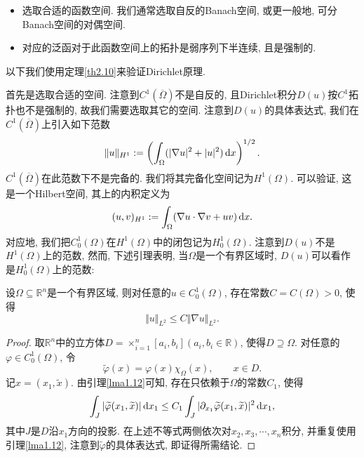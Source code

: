 \begin{itemize}
    \item 选取合适的函数空间. 我们通常选取自反的Banach空间, 或更一般地, 可分Banach空间的对偶空间.
    \item 对应的泛函对于此函数空间上的拓扑是弱序列下半连续, 且是强制的.
\end{itemize}

以下我们使用定理\ref{th2.10}来验证Dirichlet原理.

首先是选取合适的空间. 注意到$C^1(\overline{\Omega})$不是自反的, 且Dirichlet积分$D(u)$按$C^1$拓扑也不是强制的, 故我们需要选取其它的空间.
注意到$D(u)$的具体表达式, 我们在$C^1(\overline{\Omega})$上引入如下范数 
\begin{equation*}
    \Vert u \Vert_{H^1} := \left(\int_{\Omega}(|\nabla u|^2 + |u|^2) \,{\rm d}x\right)^{1/2}.
\end{equation*}
$C^1(\overline{\Omega})$在此范数下不是完备的. 我们将其完备化空间记为$H^1(\Omega)$.
可以验证, 这是一个Hilbert空间, 其上的内积定义为 
\begin{equation*}
    (u, v)_{H^1} := \int_{\Omega}(\nabla u \cdot \nabla v + uv) \,{\rm d}x. 
\end{equation*}
对应地, 我们把$C_0^1(\Omega)$在$H^1(\Omega)$中的闭包记为$H_0^1(\Omega)$. 注意到$D(u)$不是$H^1(\Omega)$上的范数, 然而, 下述引理表明, 当$\Omega$是一个有界区域时, $D(u)$可以看作是$H_0^1(\Omega)$上的范数:

\begin{lemma}[Poincaré不等式]
    设$\Omega \subseteq \mathbb{R}^n$是一个有界区域, 则对任意的$u \in C_0^1(\Omega)$, 存在常数$C = C(\Omega) > 0$, 使得 
    \begin{equation*}
        \Vert u \Vert_{L^2} \leq C\Vert \nabla u \Vert_{L^2}.
    \end{equation*}
    \begin{proof}
        取$\mathbb{R}^n$中的立方体$D = \times_{i = 1}^n[a_i, b_i] (a_i, b_i \in \mathbb{R})$, 使得$D \supseteq \Omega$. 对任意的$\varphi \in C_0^1(\Omega)$, 令 
        \begin{equation*}
            \widetilde{\varphi}(x) = \varphi(x)\chi_{\Omega}(x), \qquad x \in D.
        \end{equation*}
        记$x = (x_1, \widetilde{x})$. 由引理\ref{lma1.12}可知, 存在只依赖于$\Omega$的常数$C_1$, 使得
        \begin{equation*}
            \int_J |\widetilde{\varphi}(x_1, \widetilde{x})| \,{\rm d}x_1 \leq C_1\int_J|\partial_{x_1}\widetilde{\varphi}(x_1, \widetilde{x})|^2 \,{\rm d}x_1,
        \end{equation*}
        其中$J$是$D$沿$x_1$方向的投影. 在上述不等式两侧依次对$x_2, x_3, \cdots, x_n$积分, 并重复使用引理\ref{lma1.12}, 注意到$\widetilde{\varphi}$的具体表达式, 即证得所需结论.
    \end{proof}
\end{lemma}

